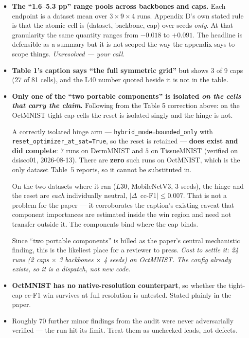 \documentclass[11pt,a4paper]{article}
\begin{document}
\begin{itemize}
\item \textbf{The ``1.6--5.3 pp'' range pools across backbones and caps.} Each endpoint is
a dataset mean over $3\times9\times4$ runs. Appendix D's own stated rule is that the atomic
cell is (dataset, backbone, cap) over seeds \emph{only}. At that granularity the same
quantity ranges from $-0.018$ to $+0.091$. The headline is defensible as a summary but it
is not scoped the way the appendix says to scope things. \emph{Unresolved --- your call.}
\item \textbf{Table 1's caption says ``the full symmetric grid''} but shows 3 of 9 caps
(27 of 81 cells), and the L40 number quoted beside it is not in the table.
\item \textbf{Only one of the ``two portable components'' is isolated \emph{on the cells
that carry the claim}.} Following from the Table 5 correction above: on the OctMNIST
tight-cap cells the reset is isolated singly and the hinge is not.

\smallskip
A correctly isolated hinge arm --- \texttt{hybrid\_mode=bounded\_only} with
\texttt{reset\_optimizer\_at\_sat=True}, so the reset is retained --- \textbf{does exist
and did complete}: $7$ runs on DermMNIST and $5$ on TissueMNIST (verified on dsisco01,
2026-08-13). There are \textbf{zero} such runs on OctMNIST, which is the only dataset
Table~5 reports, so it cannot be substituted in.

\smallskip
On the two datasets where it ran ($L30$, MobileNetV3, $3$ seeds), the hinge and the reset
are \emph{each} individually neutral, $\lvert\Delta$~cc-F1$\rvert\le0.007$. That is not a
problem for the paper --- it corroborates the caption's existing caveat that component
importances are estimated inside the win region and need not transfer outside it. The
components bind where the cap binds.

\smallskip
Since ``two portable components'' is billed as the paper's central mechanistic finding,
this is the likeliest place for a reviewer to press. \emph{Cost to settle it: 24 runs
(2 caps $\times$ 3 backbones $\times$ 4 seeds) on OctMNIST. The config already exists, so
it is a dispatch, not new code.}
\item \textbf{OctMNIST has no native-resolution counterpart}, so whether the tight-cap cc-F1
win survives at full resolution is untested. Stated plainly in the paper.
\item Roughly 70 further minor findings from the audit were never adversarially verified ---
the run hit its limit. Treat them as unchecked leads, not defects.
\end{itemize}
\end{document}
